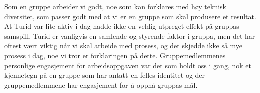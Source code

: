 \documentclass[a4paper, norsk, 12pt]{report}
\begin{document}
Som en gruppe arbeider vi godt, noe som kan forklares med høy teknisk
diversitet, som passer godt med at vi er en gruppe som skal produsere et
resultat. At Turid var lite aktiv i dag hadde ikke en veldig utpreget effekt på
gruppas samspill. Turid er vanligvis en samlende og styrende faktor i gruppa, men 
det har oftest vært viktig når vi skal arbeide med prosess, og det skjedde ikke
så mye prosess i dag, noe vi tror er forklaringen på dette. Gruppemedlemmenes
personlige engasjement for arbeidsoppgaven var det som holdt oss i gang, nok et
kjennetegn på en gruppe som har antatt en felles identitet og der
gruppemedlemmene har engasjement for å oppnå gruppas mål.
\end{document}
